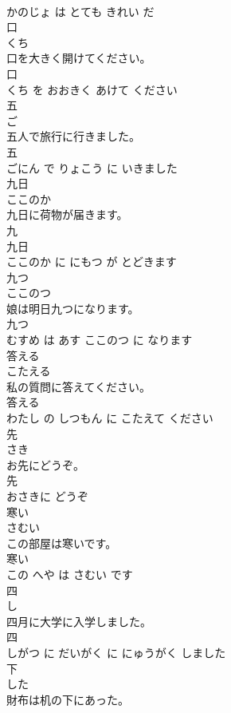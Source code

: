\documentclass[8pt]{extreport}
\begin{document}
\begin{CJK}{UTF8}{min}
\\	かのじょ は とても きれい だ			
\\	口	
\\	くち			
\\	口を大きく開けてください。	
\\	口 
\\	くち を おおきく あけて ください			
\\	五	
\\	ご			
\\	五人で旅行に行きました。	
\\	五 
\\	ごにん で りょこう に いきました			
\\	九日	
\\	ここのか			
\\	九日に荷物が届きます。	
\\	九 
\\	九日 
\\	ここのか に にもつ が とどきます			
\\	九つ	
\\	ここのつ			
\\	娘は明日九つになります。	
\\	九つ 
\\	むすめ は あす ここのつ に なります			
\\	答える	
\\	こたえる			
\\	私の質問に答えてください。	
\\	答える 
\\	わたし の しつもん に こたえて ください			
\\	先	
\\	さき			
\\	お先にどうぞ。	
\\	先 
\\	おさきに どうぞ			
\\	寒い	
\\	さむい			
\\	この部屋は寒いです。	
\\	寒い 
\\	この へや は さむい です			
\\	四	
\\	し			
\\	四月に大学に入学しました。	
\\	四 
\\	しがつ に だいがく に にゅうがく しました			
\\	下	
\\	した			
\\	財布は机の下にあった。	

\end{CJK}
\end{document}
